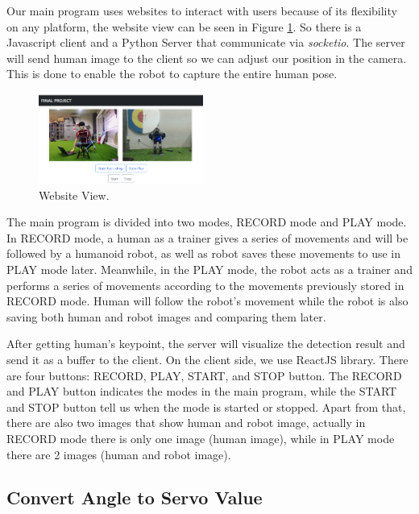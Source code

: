 Our main program uses websites to interact with users because of its flexibility on any platform, the website view can be seen in Figure \ref{fig:websiteview}. So there is a Javascript client and a Python Server that communicate via \emph{socketio}.
The server will send human image to the client so we can adjust our position in the camera. This is done to enable the robot to capture the entire human pose.
\begin{figure}[ht]
  \centering
  \includegraphics[width=0.48\textwidth]{gambar/web.png}
  \caption{Website View.}
  \label{fig:websiteview}
\end{figure}
The main program is divided into two modes, RECORD mode and PLAY mode. In RECORD mode, a human as a trainer gives a series of movements and will be followed by a humanoid robot, as well as robot saves these movements to use in PLAY mode later.
Meanwhile, in the PLAY mode, the robot acts as a trainer and performs a series of movements according to the movements previously stored in RECORD mode. Human will follow the robot's movement while the robot is also saving both human and robot images and comparing them later.

After getting human's keypoint, the server will visualize the detection result and send it as a buffer to the client.
On the client side, we use ReactJS library. There are four buttons: RECORD, PLAY, START, and STOP button. The RECORD and PLAY button indicates the modes in the main program, while the START and STOP button tell us when the mode is started or stopped.
Apart from that, there are also two images that show human and robot image, actually in RECORD mode there is only one image (human image), while in PLAY mode there are 2 images (human and robot image). 


\subsection{Convert Angle to Servo Value}
\label{subsec:convert-angle-to-servo-value}


